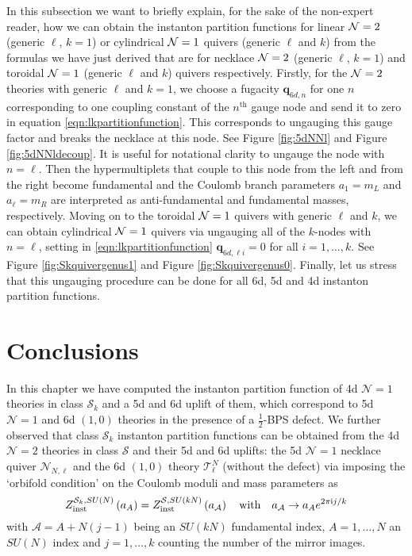 \documentclass[main.tex]{subfiles}
\begin{document}
In this subsection we want to briefly explain, for the sake of the non-expert reader, how we can obtain the instanton partition functions for linear $\mathcal{N}=2$ (generic $\ell$, $k=1$) or cylindrical $\mathcal{N}=1$ quivers (generic $\ell$ and $k$) from the formulas we have just derived that are for necklace $\mathcal{N}=2$ (generic $\ell$, $k=1$) and toroidal $\mathcal{N}=1$ (generic $\ell$ and $k$) quivers respectively.
Firstly, for the  $\mathcal{N}=2$ theories with generic $\ell$ and $k=1$,
we choose a fugacity  $\mathbf{q}_{6d,n}$ for one $n$ corresponding to one coupling constant of the $n^{\text{th}}$ gauge node and send it to zero
in equation
\eqref{eqn:lkpartitionfunction}.
This corresponds to ungauging this gauge factor and breaks the necklace at this node. See Figure \ref{fig:5dNNl} and Figure \ref{fig:5dNNldecoup}. It is useful for notational clarity to ungauge the node with $n=\ell$. Then the hypermultiplets that couple to this node from the left and from the right become fundamental and the Coulomb branch parameters $a_{1}=m_L$ and $a_{\ell}=m_R$ are interpreted as anti-fundamental and fundamental masses, respectively.
Moving on to the toroidal $\mathcal{N}=1$  quivers  with generic $\ell$ and $k$, we can obtain cylindrical  $\mathcal{N}=1$  quivers via ungauging all of the $k$-nodes with  $n=\ell$,
 setting in \eqref{eqn:lkpartitionfunction} $\mathbf{q}_{6d,\ell i}=0$ for all $i=1,\dots,k$. See Figure \ref{fig:Skquivergenus1} and Figure \ref{fig:Skquivergenus0}. 
Finally, let us stress that this ungauging procedure can be done for all 6d, 5d and 4d instanton partition functions.
\section{Conclusions}
In this chapter we have computed the instanton partition function of 4d $\mathcal{N}=1$ theories in class $\mathcal{S}_k$ and a 5d and 6d uplift of them, which correspond to 5d $\mathcal{N}=1$ and 6d $(1,0)$ theories in the presence of a $\frac{1}{2}$-BPS defect.
We further observed that class $\mathcal{S}_k$  instanton partition functions can be obtained from the 4d $\mathcal{N}=2$ theories in class $\mathcal{S}$ and their  5d and 6d uplifts: the 5d $\mathcal{N}=1$  necklace quiver $\mathcal{N}_{N,\ell}$ and the 6d $(1,0)$ theory $\mathcal{T}^N_{\ell}$ (without the defect) via imposing the `orbifold condition' on the Coulomb moduli and mass parameters as
\begin{equation}
Z_{\text{inst}}^{\mathcal{S}_k
, SU(N)}\left(a_{A}\right)=Z_{\text{inst}}^{ \mathcal{S},SU(kN) } \left(a_{\mathcal{A}}\right) 
\quad \mbox{with} \quad a_{\mathcal{A}} \rightarrow a_{A} e^{2\pi\mathrm{i} j/k} 
\end{equation}
with $\mathcal{A} =A+ N(j-1)$ being an $SU(kN)$ fundamental index, $A=1,\dots , N$ an $SU(N)$ index and $j=1,\dots , k$ counting the number of the mirror images. 
\end{document}

